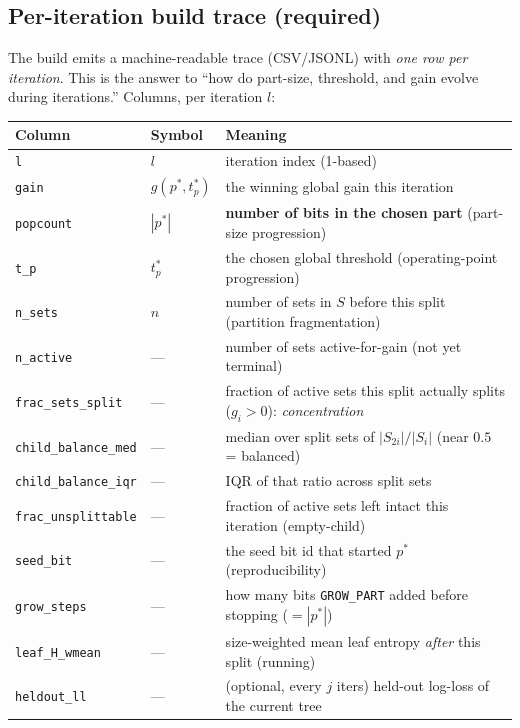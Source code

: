 \documentclass[11pt]{article}
\newcommand{\code}[1]{\texttt{#1}}
\begin{document}
\subsection{Per-iteration build trace (required)}
The build emits a machine-readable trace (CSV/JSONL) with \emph{one row per iteration}. This is the answer to ``how do part-size, threshold, and gain evolve during iterations.'' Columns, per iteration $l$:

\begin{center}
\begin{longtable}{@{}lll@{}}
\toprule
Column & Symbol & Meaning\\
\midrule
\endhead
\code{l} & $l$ & iteration index (1-based)\\
\code{gain} & $g(p^*,t_p^*)$ & the winning global gain this iteration\\
\code{popcount} & $|p^*|$ & \textbf{number of bits in the chosen part} (part-size progression)\\
\code{t\_p} & $t_p^*$ & the chosen global threshold (operating-point progression)\\
\code{n\_sets} & $n$ & number of sets in $S$ before this split (partition fragmentation)\\
\code{n\_active} & --- & number of sets active-for-gain (not yet terminal)\\
\code{frac\_sets\_split} & --- & fraction of active sets this split actually splits ($g_i>0$): \emph{concentration}\\
\code{child\_balance\_med} & --- & median over split sets of $|S_{2i}|/|S_i|$ (near $0.5$ = balanced)\\
\code{child\_balance\_iqr} & --- & IQR of that ratio across split sets\\
\code{frac\_unsplittable} & --- & fraction of active sets left intact this iteration (empty-child)\\
\code{seed\_bit} & --- & the seed bit id that started $p^*$ (reproducibility)\\
\code{grow\_steps} & --- & how many bits \code{GROW\_PART} added before stopping ($=|p^*|$)\\
\code{leaf\_H\_wmean} & --- & size-weighted mean leaf entropy \emph{after} this split (running)\\
\code{heldout\_ll} & --- & (optional, every $j$ iters) held-out log-loss of the current tree\\
\bottomrule
\end{longtable}
\end{center}
\end{document}
